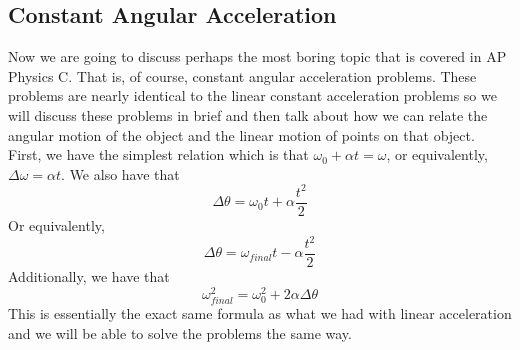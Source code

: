 \documentclass{article}[gray]
\numberwithin{equation}{subsection}
\begin{document}
\subsection{Constant Angular Acceleration}

Now we are going to discuss perhaps the most boring topic that is covered in AP Physics C. That is, of course, constant angular acceleration problems. These problems are nearly identical to the linear constant acceleration problems so we will discuss these problems in brief and then talk about how we can relate the angular motion of the object and the linear motion of points on that object. First, we have the simplest relation which is that $\omega_0+\alpha t=\omega$, or equivalently, $\Delta \omega=\alpha t$. We also have that \begin{equation}\Delta \theta=\omega_0 t+\alpha \frac{t^2}{2}\end{equation} Or equivalently, \begin{equation}\Delta \theta=\omega_{final}t-\alpha \frac{t^2}{2}\end{equation} Additionally, we have that \begin{equation}\omega_{final}^2 = \omega_{0}^2+2\alpha \Delta \theta\end{equation} This is essentially the exact same formula as what we had with linear acceleration and we will be able to solve the problems the same way. 
\end{document}
